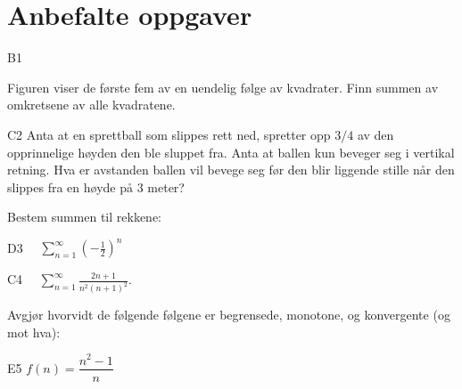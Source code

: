 \documentclass[a4paper,norsk,11pt]{interaktiv}
\begin{document}
\section*{Anbefalte oppgaver}




\begin{oppgave}{B1} %
  \begin{minipage}[t]{1\textwidth}
  \begin{minipage}[t]{0.5\textwidth}
    Figuren viser de første fem av en uendelig følge av kvadrater.
    Finn summen av omkretsene av alle kvadratene.
  \end{minipage}
  \quad
  \begin{minipage}[t][3cm][b]{0.45\linewidth}
    \centering
  \end{minipage}
\end{minipage}
\end{oppgave}

\begin{oppgave}{C2}
  Anta at en sprettball som slippes rett ned, spretter opp $3/4$ av den
  opprinnelige høyden den ble sluppet fra.  Anta at ballen kun beveger
  seg i vertikal retning.  Hva er avstanden ballen vil bevege seg før
  den blir liggende stille når den slippes fra en høyde på $3$ meter?
\end{oppgave}

Bestem summen til rekkene:

\begin{oppgave}{D3}
    $\quad \displaystyle \sum_{n = 1}^\infty \left(-\frac12\right)^n$
\end{oppgave}

\begin{oppgave}{C4}
    $ \quad \displaystyle \sum_{n = 1}^\infty \frac{2n + 1}{n^2 (n + 1)^2}$.
\end{oppgave}

Avgjør hvorvidt de følgende følgene er begrensede, monotone, og konvergente (og mot hva):


\begin{oppgave}{E5}
\quad $f(n)=\dfrac{n^2 -1}{n}$
\end{oppgave}
\end{document}
